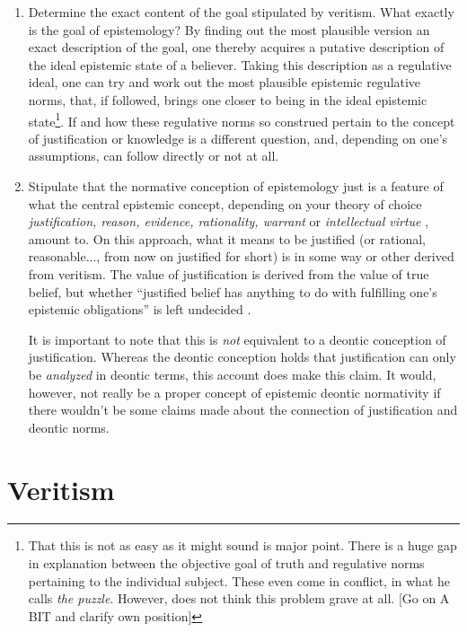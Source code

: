 \documentclass[12pt,numbers=noenddot]{scrartcl}
\begin{document}
\begin{enumerate}
    \item Determine the exact content of the goal stipulated by veritism. What exactly is the goal of epistemology? By finding out the most plausible version an exact description of the goal, one thereby acquires a putative description of the ideal epistemic state of a believer. Taking this description as a regulative ideal, one can try and work out the most plausible epistemic regulative norms, that, if followed, brings one closer to being in the ideal epistemic state\footnote{That this is not as easy as it might sound is \textcite{Gibbons2013-GIBTNO} major point. There is a huge gap in explanation between the objective goal of truth and regulative norms pertaining to the individual subject. These even come in conflict, in what he calls \emph{the puzzle}. However, \textcite{Goldman2002-GOLTUO-2} does not think this problem grave at all. [Go on A BIT and clarify own position]}.
    If and how these regulative norms so construed pertain to the concept of justification or knowledge is a different question, and, depending on one's assumptions, can follow directly or not at all.
    \item Stipulate that the normative conception of epistemology just is a feature of what the central epistemic concept, depending on your theory of choice \emph{justification, reason, evidence, rationality, warrant} or \emph{intellectual virtue} \autocite[153]{David2001-DAVTAT-7}, amount to. On this approach, what it means to be justified (or rational, reasonable..., from now on justified for short) is in some way or other derived from veritism. The value of justification is derived from the value of true belief, but whether “justified belief has anything to do with fulfilling one's epistemic obligations” is left undecided \autocite[66]{Steup1988-STETDC}.

    It is important to note that this is \emph{not} equivalent to a deontic conception of justification. Whereas the deontic conception holds that justification can only be \emph{analyzed} in deontic terms, this account does make this claim. It would, however, not really be a proper concept of epistemic deontic normativity if there wouldn't be some claims made about the connection of justification and deontic norms.
\end{enumerate}

\clearpage

\section{Veritism}
\end{document}
